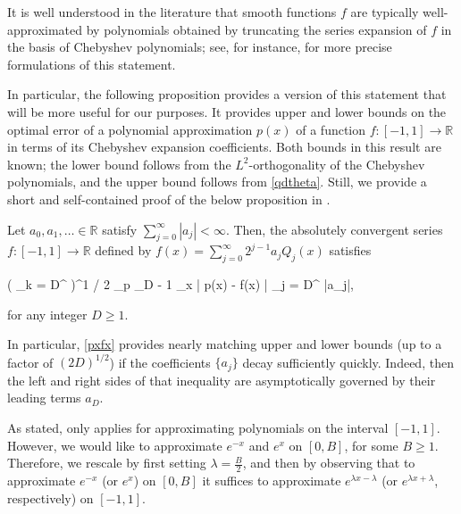 	
	


    It is well understood in the literature that smooth functions $f$ are typically well-approximated by polynomials obtained by truncating the series expansion of $f$ in the basis of Chebyshev polynomials; see, for instance, \cite[(15.5), (15.8)]{AT} for more precise formulations of this statement. 
    
    In particular, the following proposition provides a version of this statement that will be more useful for our purposes. It provides upper and lower bounds on the optimal error of a polynomial approximation $p(x)$ of a function $f: [-1, 1] \rightarrow \mathbb{R}$ in terms of its Chebyshev expansion coefficients. Both bounds in this result are known; the lower bound follows from the $L^2$-orthogonality of the Chebyshev polynomials, and the upper bound follows from \eqref{qdtheta}. Still, we provide a short and self-contained proof of the below proposition in .

	
	\begin{proposition}
		
		\label{ajcj}
		
		Let $a_0, a_1, \ldots \in \mathbb{R}$ satisfy $\sum_{j = 0}^{\infty} |a_j| < \infty$. Then, the absolutely convergent series $f: [-1, 1] \rightarrow \mathbb{R}$ defined by $f(x) = \sum_{j = 0}^{\infty} 2^{j - 1} a_j Q_j (x)$ satisfies 
		\begin{flalign}
		\label{pxfx}
		\left( \displaystyle{} \displaystyle\sum_{k = D}^{\infty} \displaystyle{} \right)^{1 / 2} \le \displaystyle\inf_{p \in {}_{D - 1}} \displaystyle\sup_{x \in [-1, 1]} \big| p(x) - f(x) \big| \le \displaystyle\sum_{j = D}^{\infty} |a_j|,
		\end{flalign}
		
		\noindent for any integer $D \ge 1$.
		
		
	\end{proposition}
	
	In particular, \eqref{pxfx} provides nearly matching upper and lower bounds (up to a factor of $(2D)^{1/2}$) if the coefficients $\{ a_j \}$ decay sufficiently quickly. Indeed, then the left and right sides of that inequality are asymptotically governed by their leading terms $a_D$. 
	
	As stated,  only applies for approximating polynomials on the interval $[-1, 1]$. However, we would like to approximate $e^{-x}$ and $e^x$ on $[0, B]$, for some $B \ge 1$. Therefore, we rescale by first setting $\lambda = \frac{B}{2}$, and then by observing that to approximate $e^{-x}$ (or $e^x$) on $[0, B]$ it suffices to approximate $e^{\lambda x - \lambda}$ (or $e^{\lambda x + \lambda}$, respectively) on $[-1, 1]$. 
	
